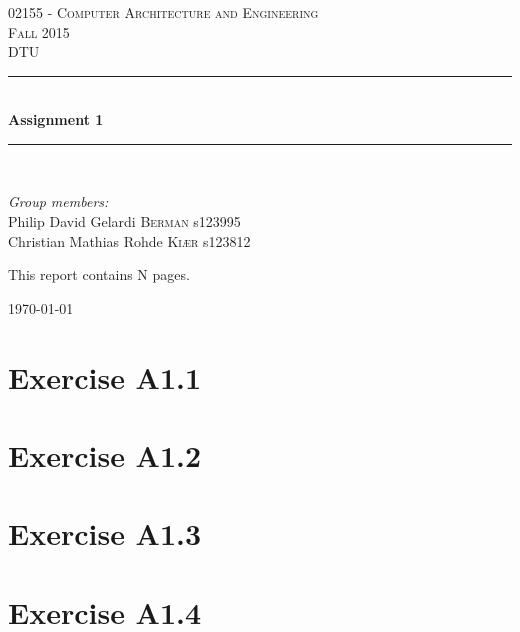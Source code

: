 \documentclass{article}
\title{
\HRule \\
\textsc{\doctitle} \\
	 \small{\textsl{\docsubtitle}}
\HRule
}
\author{\docauthor\\\small{\docplace}}
\date{\docdate}
\newcommand{\HRule}{\rule{\linewidth}{0.5mm}}
\begin{document}
\begin{titlepage}
\begin{center}
\textsc{\LARGE 02155 - Computer Architecture and Engineering \\Fall 2015}\\[1.5cm]
\textsc{\large DTU}\\[0.5cm]
\HRule \\[0.4cm]
{ \huge \bfseries Assignment 1}\\[0.1cm]
\HRule \\[1.5cm]
\end{center}
\begin{flushleft} \large
\emph{Group members:}\\
Philip David Gelardi \textsc{Berman} s123995\\
Christian Mathias Rohde \textsc{Kiær} s123812\\
\end{flushleft}
\vfill 
\begin{flushleft} \large
This report contains N pages.
\end{flushleft}
\vfill 
\begin{center}
{\large \today}
\end{center}
\end{titlepage}
\newpage

\section*{Exercise A1.1}
\section*{Exercise A1.2}
\section*{Exercise A1.3}
\section*{Exercise A1.4}
\end{document}
